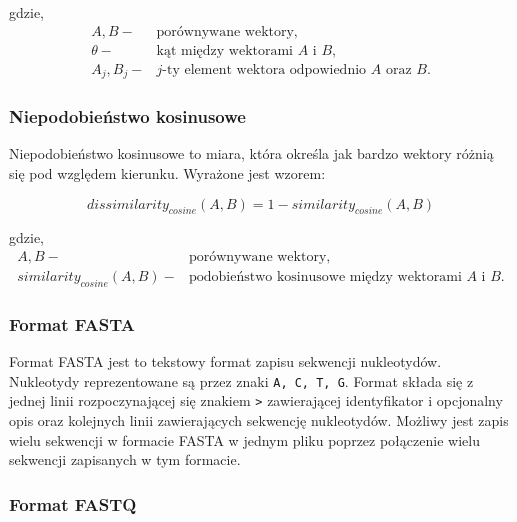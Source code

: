             gdzie,
            \begin{align*}
                A, B -& \text{porównywane wektory,} \\
                \theta -& \text{kąt między wektorami $A$ i $B$,} \\
                A_j, B_j -& \text{$j$-ty element wektora odpowiednio $A$ oraz $B$.}
            \end{align*}

        \subsubsection{Niepodobieństwo kosinusowe}

            Niepodobieństwo kosinusowe to miara, która określa jak bardzo wektory różnią się pod względem kierunku. Wyrażone jest wzorem:

            \begin{equation}
                dissimilarity_{cosine}(A, B) = 1 - similarity_{cosine}(A, B)
                \label{Equation:CosineDissimilarity}
            \end{equation}

            gdzie,
            \begin{align*}
                A, B -& \text{porównywane wektory,} \\
                similarity_{cosine}(A, B) -& \text{podobieństwo kosinusowe między wektorami $A$ i $B$.}
            \end{align*}

        \subsubsection{Format FASTA}

            Format FASTA jest to tekstowy format zapisu sekwencji nukleotydów. Nukleotydy reprezentowane są przez znaki \texttt{A, C, T, G}. Format składa się z jednej linii rozpoczynającej się znakiem \texttt{>} zawierającej identyfikator i opcjonalny opis oraz kolejnych linii zawierających sekwencję nukleotydów. Możliwy jest zapis wielu sekwencji w formacie FASTA w jednym pliku poprzez połączenie wielu sekwencji zapisanych w tym formacie.

        \subsubsection{Format FASTQ} 

